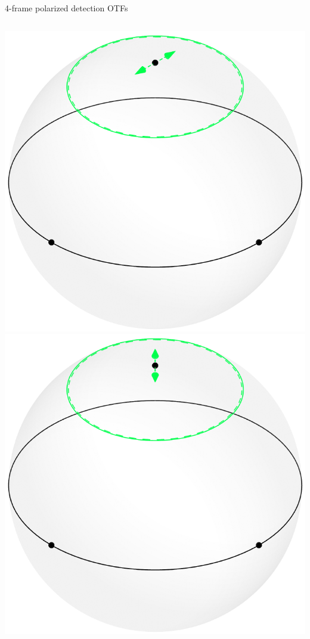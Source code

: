 \documentclass[presentation]{beamer}
\begin{document}
\begin{frame}[label=sec-1]{4-frame polarized detection OTFs}
  \begin{columns}
    \begin{column}{0.25\textwidth}
      \centering      
      \includegraphics[width=1.0\columnwidth]{pol_detect/scene0.pdf}\\
      \includegraphics[width=1.0\columnwidth]{pol_detect/scene1.pdf}

\end{column}
\end{columns}
\end{frame}
\end{document}
